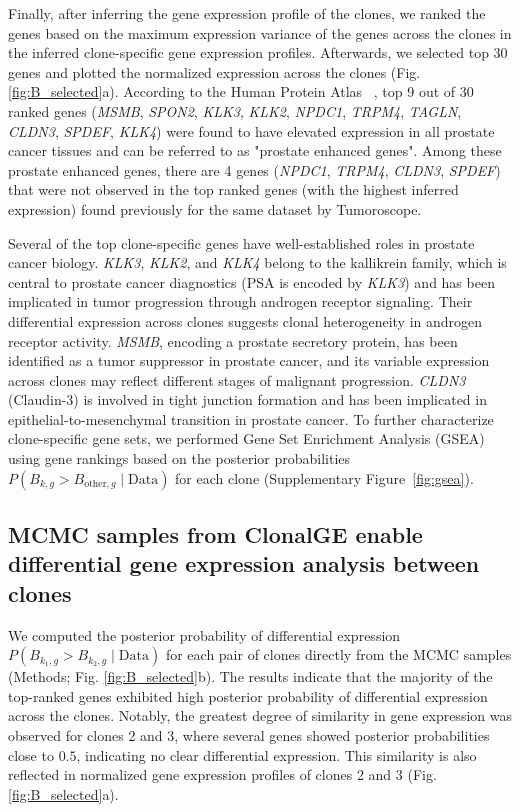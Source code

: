 \documentclass[unnumsec,webpdf,contemporary,large]{oup-authoring-template}%
\theoremstyle{thmstyleone}%
\theoremstyle{thmstyletwo}%
\theoremstyle{thmstylethree}%
\newcommand{\rev}[1]{{\color{revisionblue}#1}}
\begin{document}
Finally, after inferring the gene expression profile of the clones, we ranked the genes based on the maximum expression variance of the genes across the clones in the inferred clone-specific gene expression profiles. Afterwards, we selected top 30 genes and plotted the normalized expression across the clones (Fig. \ref{fig:B_selected}a). According to the Human Protein Atlas ~\citep{ponten2008human}, top 9 out of 30 ranked genes ({\it MSMB}, {\it SPON2}, {\it KLK3}, {\it KLK2}, {\it NPDC1}, {\it TRPM4}, {\it TAGLN}, {\it CLDN3}, {\it SPDEF}, {\it KLK4}) were found to have elevated expression in all prostate cancer tissues and can be referred to as "prostate enhanced genes". %
Among these prostate enhanced genes, there are 4 genes ({\it NPDC1}, {\it TRPM4}, {\it CLDN3}, {\it SPDEF}) that were not observed in the top ranked genes (with the highest inferred expression) found previously  for the same dataset by Tumoroscope.

\rev{Several of the top clone-specific genes have well-established roles in prostate cancer biology. {\it KLK3}, {\it KLK2}, and {\it KLK4} belong to the kallikrein family, which is central to prostate cancer diagnostics (PSA is encoded by {\it KLK3}) and has been implicated in tumor progression through androgen receptor signaling. Their differential expression across clones suggests clonal heterogeneity in androgen receptor activity. {\it MSMB}, encoding a prostate secretory protein, has been identified as a tumor suppressor in prostate cancer, and its variable expression across clones may reflect different stages of malignant progression. {\it CLDN3} (Claudin-3) is involved in tight junction formation and has been implicated in epithelial-to-mesenchymal transition in prostate cancer. To further characterize clone-specific gene sets, we performed Gene Set Enrichment Analysis (GSEA) using gene rankings based on the posterior probabilities $P(B_{k,g} > B_{\text{other},g} \mid \text{Data})$ for each clone (Supplementary Figure~\ref{fig:gsea}).}

\subsection*{MCMC samples from ClonalGE enable differential gene expression analysis between clones}
\rev{We computed the posterior probability of differential expression $P(B_{k_1,g} > B_{k_2,g} \mid \text{Data})$ for each pair of clones directly from the MCMC samples} (Methods; Fig. \ref{fig:B_selected}b).
The results indicate that the majority of the top-ranked genes exhibited \rev{high posterior probability of differential expression} across the clones. Notably, the greatest degree of similarity in gene expression was observed for clones 2 and 3, where \rev{several} genes \rev{showed posterior probabilities close to $0.5$, indicating no clear differential expression}. This similarity is also reflected in normalized gene expression profiles of clones 2 and 3 (Fig. \ref{fig:B_selected}a).
\end{document}

